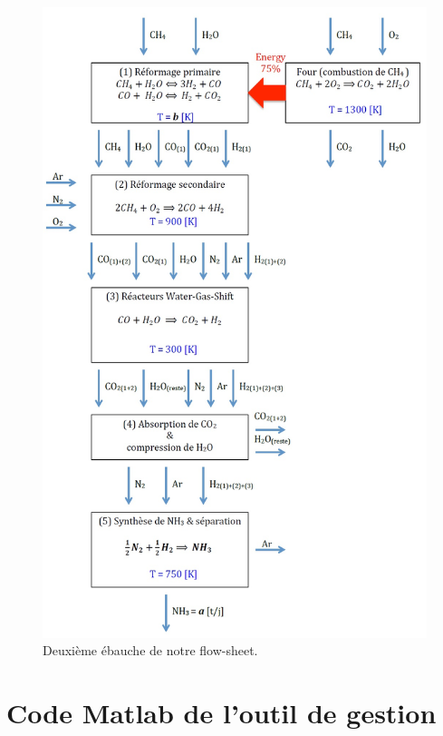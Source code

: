 \begin{figure}[htb!]
	\centering
	\includegraphics[scale=0.65]{flow-sheet-v2.jpg}
	\caption{Deuxième ébauche de notre flow-sheet.}
	\label{flow-sheet-v2}
\end{figure}
\newpage

\section{Code Matlab de l'outil de gestion}
\label{code-matlab-outil}



